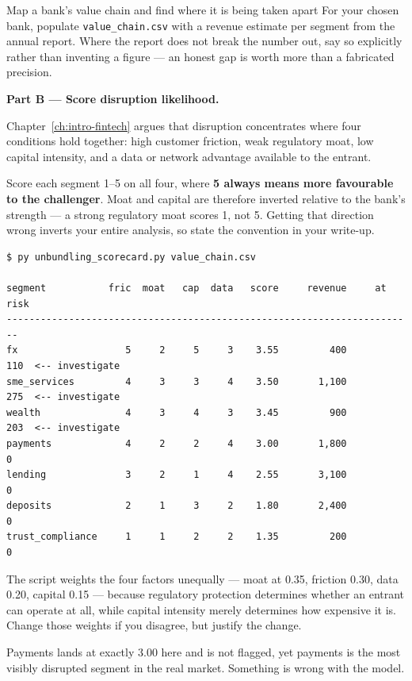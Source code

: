 \begin{labproject}{Map a bank's value chain and find where it is being taken apart}
For your chosen bank, populate \texttt{value\_chain.csv} with a revenue estimate per segment from the annual report. Where the report does not break the number out, say so explicitly rather than inventing a figure --- an honest gap is worth more than a fabricated precision.

\medskip\noindent\textbf{Part B --- Score disruption likelihood.}\par
Chapter~\ref{ch:intro-fintech} argues that disruption concentrates where four conditions hold together: high customer friction, weak regulatory moat, low capital intensity, and a data or network advantage available to the entrant.

Score each segment 1--5 on all four, where \textbf{5 always means more favourable to the challenger}. Moat and capital are therefore inverted relative to the bank's strength --- a strong regulatory moat scores 1, not 5. Getting that direction wrong inverts your entire analysis, so state the convention in your write-up.

\begin{lstlisting}[style=mlterminal]
$ py unbundling_scorecard.py value_chain.csv

segment           fric  moat   cap  data   score     revenue     at risk
------------------------------------------------------------------------
fx                   5     2     5     3    3.55         400         110  <-- investigate
sme_services         4     3     3     4    3.50       1,100         275  <-- investigate
wealth               4     3     4     3    3.45         900         203  <-- investigate
payments             4     2     2     4    3.00       1,800           0
lending              3     2     1     4    2.55       3,100           0
deposits             2     1     3     2    1.80       2,400           0
trust_compliance     1     1     2     2    1.35         200           0
\end{lstlisting}

The script weights the four factors unequally --- moat at 0.35, friction 0.30, data 0.20, capital 0.15 --- because regulatory protection determines whether an entrant can operate at all, while capital intensity merely determines how expensive it is. Change those weights if you disagree, but justify the change.

\begin{tryit}
Payments lands at exactly 3.00 here and is not flagged, yet payments is the most visibly disrupted segment in the real market. Something is wrong with the model.


\end{tryit}
\end{labproject}
